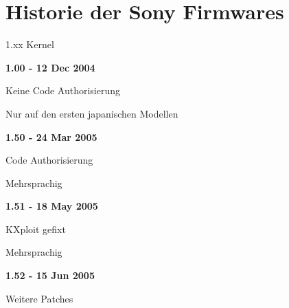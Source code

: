 \documentclass[mode=print,paper=screen,size=10pt,style=paintings]{powerdot}
\begin{document}
\section{Historie der Sony Firmwares}
\begin{slide}{1.xx Kernel}
	\begin{large}\textbf{1.00 - 12 Dec 2004}\end{large}
	\begin{list}{-}{}
		\item{Keine Code Authorisierung}
		\item{Nur auf den ersten japanischen Modellen}
	\end{list}
	\begin{large}\textbf{1.50 - 24 Mar 2005}\end{large}
	\begin{list}{-}{}
		\item{Code Authorisierung}
		\item{Mehrsprachig}
	\end{list}
	\begin{large}\textbf{1.51 - 18 May 2005}\end{large}
	\begin{list}{-}{}
		\item{KXploit gefixt}
		\item{Mehrsprachig}
	\end{list}
	\begin{large}\textbf{1.52 - 15 Jun 2005}\end{large}
	\begin{list}{-}{}
		\item{Weitere Patches}
	\end{list}
\end{slide}
\end{document}
